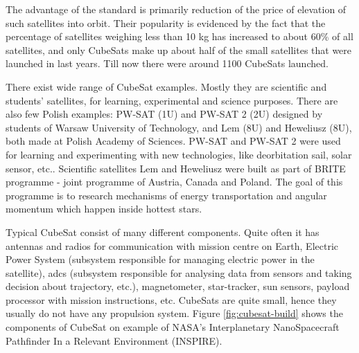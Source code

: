 \documentclass[12pt,a4paper,twoside]{article}
\begin{document}
The advantage of the standard is primarily reduction of the price of elevation of such satellites into orbit. Their popularity is evidenced by the fact that the percentage of satellites weighing less than 10 kg has increased to about 60\% of all satellites, and only CubeSats make up about half of the small satellites that were launched in last years\cite{swartwout2011brief}\cite{swartwout2013first}. Till now there were around 1100 CubeSats launched\cite{nanosats}.

There exist wide range of CubeSat examples. Mostly they are scientific and students' satellites, for learning, experimental and science purposes. There are also few Polish examples: PW-SAT (1U) and PW-SAT 2 (2U) designed by students of Warsaw University of Technology, and Lem (8U) and Heweliusz (8U), both made at Polish Academy of Sciences. PW-SAT and PW-SAT 2 were used for learning and experimenting with new technologies, like deorbitation sail, solar sensor, etc.\cite{pw-sat2}.
Scientific satellites Lem and Heweliusz were built as part of BRITE programme - joint programme of Austria, Canada and Poland. The goal of this programme is to research mechanisms of energy transportation and angular momentum which happen inside hottest stars\cite{brite-pl}.

Typical CubeSat consist of many different components. Quite often it has antennas and radios for communication with mission centre on Earth, Electric Power System (subsystem responsible for managing electric power in the satellite), \gls{adcs} (subsystem responsible for analysing data from sensors and taking decision about trajectory, etc.), magnetometer, star-tracker, sun sensors, payload processor with mission instructions, etc. CubeSats are quite small, hence they usually do not have any propulsion system\cite{lemmer2017propulsion}. Figure \ref{fig:cubesat-build} shows the components of CubeSat on example of NASA's Interplanetary NanoSpacecraft Pathfinder In a Relevant Environment (INSPIRE).
\end{document}
